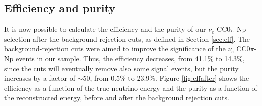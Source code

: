 \subsection{Efficiency and purity}
It is now possible to calculate the efficiency and the purity of our $\nu_{e}$ CC0$\pi$-Np selection after the background-rejection cuts, as defined in Section \ref{sec:eff}. The background-rejection cuts were aimed to improve the significance of the $\nu_{e}$ CC0$\pi$-Np events in our sample. Thus, the efficiency decreases, from 41.1\% to 14.3\%, since the cuts will eventually remove also some signal events, but the purity increases by a factor of $\sim50$, from 0.5\% to 23.9\%. Figure \ref{fig:effafter} shows the efficiency as a function of the true neutrino energy and the purity as a function of the reconstructed energy, before and after the background rejection cuts. 

